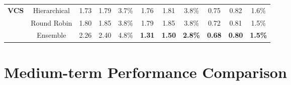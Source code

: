 \documentclass{article}
\begin{document}
\begin{table}[h!]
{\begin{tabular}{c|c|ccc|ccc|ccc}
\multirow{3}{*}{\textbf{VCS}}
& Hierarchical & 1.73 & 1.79 & 3.7\% & 1.76 & 1.81 & 3.8\% & 0.75 & 0.82 & 1.6\% \\
& Round Robin & 1.80 & 1.85 & 3.8\% & 1.79 & 1.85 & 3.8\% & 0.72 & 0.81 & 1.5\% \\
& Ensemble & 2.26 & 2.40 & 4.8\% & \textbf{1.31} & \textbf{1.50} & \textbf{2.8\%} & \textbf{0.68} & \textbf{0.80} & \textbf{1.5\%} \\

\bottomrule
\end{tabular}
}
\end{table}

\section{Medium-term Performance Comparison}
\end{document}
